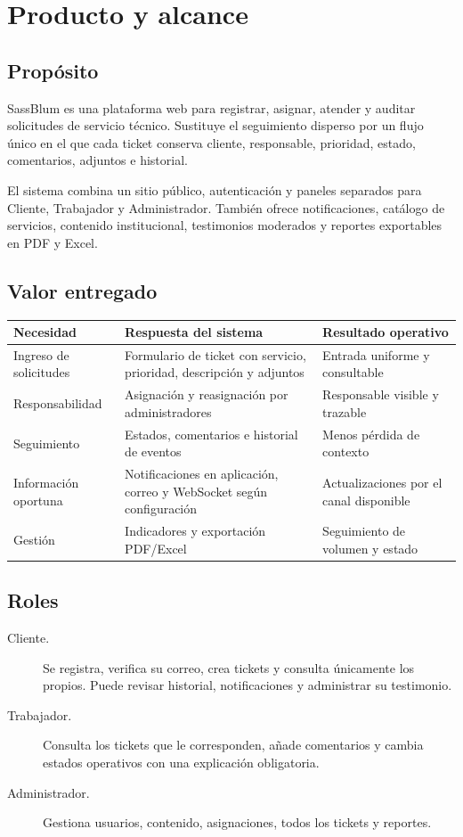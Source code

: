 \chapter{Producto y alcance}

\section{Propósito}

SassBlum es una plataforma web para registrar, asignar, atender y auditar solicitudes de servicio
técnico. Sustituye el seguimiento disperso por un flujo único en el que cada ticket conserva
cliente, responsable, prioridad, estado, comentarios, adjuntos e historial.

El sistema combina un sitio público, autenticación y paneles separados para Cliente, Trabajador y
Administrador. También ofrece notificaciones, catálogo de servicios, contenido institucional,
testimonios moderados y reportes exportables en PDF y Excel.

\section{Valor entregado}

\begin{tabularx}{\textwidth}{@{}L{0.25\textwidth}Y Y@{}}
\toprule
\textbf{Necesidad} & \textbf{Respuesta del sistema} & \textbf{Resultado operativo}\\
\midrule
Ingreso de solicitudes & Formulario de ticket con servicio, prioridad, descripción y adjuntos & Entrada uniforme y consultable\\
Responsabilidad & Asignación y reasignación por administradores & Responsable visible y trazable\\
Seguimiento & Estados, comentarios e historial de eventos & Menos pérdida de contexto\\
Información oportuna & Notificaciones en aplicación, correo y WebSocket según configuración & Actualizaciones por el canal disponible\\
Gestión & Indicadores y exportación PDF/Excel & Seguimiento de volumen y estado\\
\bottomrule
\end{tabularx}

\section{Roles}

\begin{description}
  \item[Cliente.] Se registra, verifica su correo, crea tickets y consulta únicamente los propios.
  Puede revisar historial, notificaciones y administrar su testimonio.
  \item[Trabajador.] Consulta los tickets que le corresponden, añade comentarios y cambia estados
  operativos con una explicación obligatoria.
  \item[Administrador.] Gestiona usuarios, contenido, asignaciones, todos los tickets y reportes.
\end{description}

